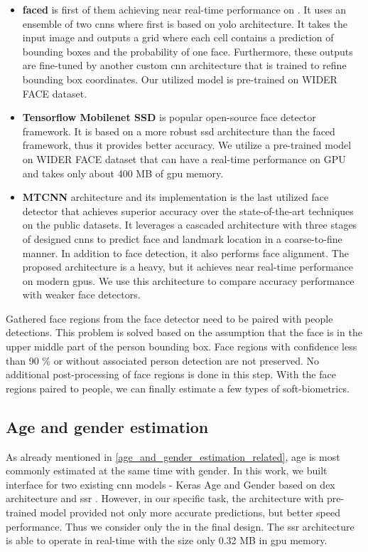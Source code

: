         \begin{itemize}
            \item \textbf{faced} \cite{faced} is first of them achieving near real-time performance on . It uses an ensemble of two \gls{cnn}s where first is based on \gls{yolo} architecture. It takes the input image and outputs a grid where each cell contains a prediction of bounding boxes and the probability of one face. Furthermore, these outputs are fine-tuned by another custom \gls{cnn} architecture that is trained to refine bounding box coordinates. Our utilized model is pre-trained on WIDER FACE \cite{yang2016wider} dataset. 
            \item \textbf{Tensorflow Mobilenet SSD} \cite{itzcovichtfdetector} is popular open-source face detector framework. It is based on a more robust \gls{ssd} architecture than the faced framework, thus it provides better accuracy. We utilize a pre-trained model on WIDER FACE \cite{yang2016wider} dataset that can have a real-time performance on GPU and takes only about 400 MB of \gls{gpu} memory.
            \item \textbf{MTCNN} architecture \cite{7553523} and its implementation \cite{centenomtcnn} is the last utilized face detector that achieves superior accuracy over the state-of-the-art techniques on the public datasets. It leverages a cascaded architecture with three stages of designed \gls{cnn}s to predict face and landmark location in a coarse-to-fine manner. In addition to face detection, it also performs face alignment. The proposed architecture is a heavy, but it achieves near real-time performance on modern \gls{gpu}s. We use this architecture to compare accuracy performance with weaker face detectors.
        \end{itemize}
        
        Gathered face regions from the face detector need to be paired with people detections. This problem is solved based on the assumption that the face is in the upper middle part of the person bounding box. Face regions with confidence less than 90 \% or without associated person detection are not preserved. No additional post-processing of face regions is done in this step. With the face regions paired to people, we can finally estimate a few types of soft-biometrics.
        
        \subsection{Age and gender estimation}\label{age_gender_estimation}
            As already mentioned in \ref{age_and_gender_estimation_related}, age is most commonly estimated at the same time with gender. In this work, we built interface for two existing \gls{cnn} models - Keras Age and Gender \cite{kerasagender} based on \gls{dex} architecture and \gls{ssr} \cite{yang2018ssr}. However, in our specific task, the  architecture with pre-trained model provided not only more accurate predictions, but better speed performance. Thus we consider only the  in the final design. The \gls{ssr} architecture is able to operate in real-time with the size only 0.32 MB in \gls{gpu} memory. 
            
